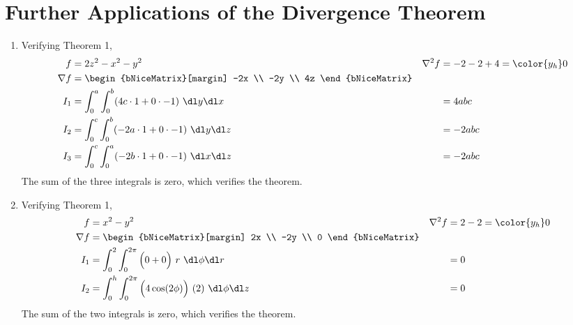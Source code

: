 \section{Further Applications of the Divergence Theorem}

\begin{enumerate}
    \item Verifying Theorem 1,
          \begin{align}
              f             & = 2z^2 - x^2 - y^2                                     &
              \nabla^2 f    & = -2 - 2 + 4 = \color{y_h} 0                             \\
              \nabla f      & = \begin{bNiceMatrix}[margin]
                                    -2x \\ -2y \\ 4z
                                \end{bNiceMatrix}                             \\
              I_1           & = \int_{0}^{a} \int_{0}^{b} (4c \cdot 1 + 0 \cdot -1)
              \ \dl y \dl x &
                            & = 4abc                                                   \\
              I_2           & = \int_{0}^{c} \int_{0}^{b} (-2a \cdot 1 + 0 \cdot -1)
              \ \dl y \dl z &
                            & = -2abc                                                  \\
              I_3           & = \int_{0}^{c} \int_{0}^{a} (-2b \cdot 1 + 0 \cdot -1)
              \ \dl x \dl z &
                            & = -2abc
          \end{align}
          The sum of the three integrals is zero, which verifies the theorem.

    \item Verifying Theorem 1,
          \begin{align}
              f                & = x^2 - y^2                                        &
              \nabla^2 f       & = 2 - 2 = \color{y_h} 0                              \\
              \nabla f         & = \begin{bNiceMatrix}[margin]
                                       2x \\ -2y \\ 0
                                   \end{bNiceMatrix}                         \\
              I_1              & = \int_{0}^{2} \int_{0}^{2\pi} \Big( 0+0 \Big) \ r
              \ \dl \phi \dl r &
                               & = 0                                                  \\
              I_2              & = \int_{0}^{h} \int_{0}^{2\pi} \Big( 4\cos(2\phi)
              \Big) \ (2)
              \ \dl \phi \dl z &
                               & = 0
          \end{align}
          The sum of the two integrals is zero, which verifies the theorem.


\end{enumerate}
